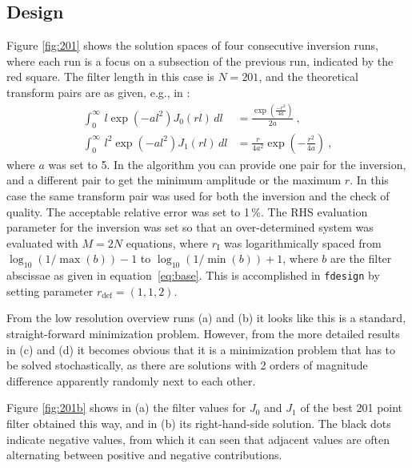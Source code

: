 \documentclass[paper,twocolumn,twoside]{geophysics}
\newcommand{\mr}[1]{\mathrm{#1}}
\begin{document}
\subsection{Design}
Figure \ref{fig:201} shows the solution spaces of four consecutive inversion
runs, where each run is a focus on a subsection of the previous run, indicated
by the red square.
%
%
%
The filter length in this case is $N=201$, and the theoretical transform pairs
are as given, e.g., in \cite{USGS.75.Anderson}:
%
\begin{align}
  \int^\infty_0\,l \exp\left(-al^2\right) J_0(rl)\,dl &=
  \frac{\exp\left(\frac{-r^2}{4a}\right)}{2a}\ , \\
  \int^\infty_0\,l^2 \exp\left(-al^2\right) J_1(rl)\,dl &=
  \frac{r}{4a^2} \exp\left(-\frac{r^2}{4a}\right)\ ,
  \label{eq:j01}
\end{align}
%
where $a$ was set to 5. In the algorithm you can provide one pair for the
inversion, and a different pair to get the minimum amplitude or the maximum
$r$. In this case the same transform pair was used for both the inversion and
the check of quality. The acceptable relative error was set to 1\,\%. The RHS
evaluation parameter for the inversion was set so  that an over-determined
system was evaluated with $M = 2N$ equations, where $r_\mr{I}$ was
logarithmically spaced from $\log_{10}(1/\max(b)) - 1$ to $\log_{10}(1/\min(b))
+ 1$, where $b$ are the filter abscissae as given in equation~\ref{eq:base}.
This is accomplished in \texttt{fdesign} by setting parameter $r_\mr{def} = (1,
1, 2)$.

From the low resolution overview runs (a) and (b) it looks like this is a
standard, straight-forward minimization problem. However, from the more
detailed results in (c) and (d) it becomes obvious that it is a minimization
problem that has to be solved stochastically, as there are solutions with 2
orders of magnitude difference apparently randomly next to each other.

Figure \ref{fig:201b} shows in (a) the filter values for $J_0$ and $J_1$ of the
best 201 point filter obtained this way, and in (b) its right-hand-side
solution. The black dots indicate negative values, from which it can seen that
adjacent values are often alternating between positive and negative
contributions.
%
%
\end{document}
